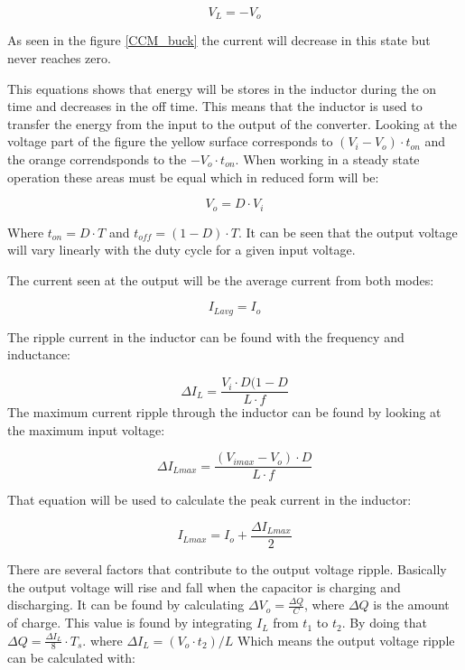 \begin{equation}
V_L = -V_o
\end{equation} 

As seen in the figure \ref{CCM_buck} the current will decrease in this state but never reaches zero.

This equations shows that energy will be stores in the inductor during the on time and decreases in the off time. This means that the inductor is used to transfer the energy from the input to the output of the converter. 
Looking at the voltage part of the figure the yellow surface corresponds to $(V_i-V_o)\cdot t_{on}$ and the orange correndsponds to the $-V_o\cdot t_{on}$. When working in a steady state operation these areas must be equal which in reduced form will be:

\begin{equation}
V_o = D\cdot V_i
\end{equation}

Where $t_{on}=D\cdot T$ and $t_{off}=(1-D)\cdot T$. It can be seen that the output voltage will vary linearly with the duty cycle for a given input voltage.

The current seen at the output will be the average current from both modes:

\begin{equation}
I_{Lavg}=I_o
\end{equation}

The ripple current in the inductor can be found with the frequency and inductance:

\begin{equation}\label{buckind}
\Delta I_L = \frac{V_i\cdot D(1-D}{L\cdot f}
\end{equation}
The maximum current ripple through the inductor can be found by looking at the maximum input voltage:

\begin{equation}
\Delta I_{Lmax} = \frac{(V_{imax}-V_{o})\cdot D}{L\cdot f}
\end{equation}

That equation will be used to calculate the peak current in the inductor:

\begin{equation}
I_{Lmax} = I_o + \frac{\Delta I_{Lmax}}{2}
\end{equation}

There are several factors that contribute to the output voltage ripple. Basically the output voltage will rise and fall when the capacitor is charging and discharging. It can be found by calculating $\Delta V_o = \frac{\Delta Q}{C}$, where $\Delta Q$ is the amount of charge. This value is found by integrating $I_L$ from $t_1$ to $t_2$. By doing that $\Delta Q = \frac{\Delta I_L}{8}\cdot T_s$. where $\Delta I_L = (V_o\cdot t_2)/L$ Which means the output voltage ripple can be calculated with:
 
